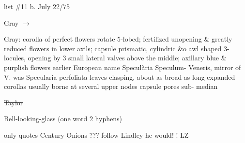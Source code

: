 \documentclass[a4paper]{article}
\begin{document}
\begin{minipage}{0.1\textwidth}
\Circled{\color{blue}{13}} 
\end{minipage}
\begin{minipage}{0.2\textwidth}
\color{blue}
\null list \#11
b. July 22/75
\end{minipage}
\begin{minipage}{0.7\textwidth}
\begin{flushright}
\color{blue}
\par
Gray
$\rightarrow$
\color{red}\Circled{\color{blue}{Venus's Looking-glass}}\par
\end{flushright}
\end{minipage}
\color{blue}
\begin{minipage}[t]{0.2\textwidth}
Gray: corolla
of perfect flowers
rotate 5-lobed;
fertilized
unopening \&
greatly reduced
flowers in lower
axils; capsule
prismatic, cylindric
\&o awl shaped 3-
locules, opening
by 3 small lateral
valves
above the
middle; axillary
blue \& purplish %
flowers earlier
European name
Specul\`aria Speculum- 
Veneris, mirror of V.
was Specularia perfoliata
leaves clasping, about as
broad as long expanded
corollas usually borne
at several upper nodes
capsule pores sub-
median

\sout{Taylor}

Bell-looking-glass
(one word
2 hyphens)

only
quotes Century
Onions ???
follow Lindley
he would!
! LZ
\end{minipage}
\hspace{0.1\textwidth}
\end{document}
